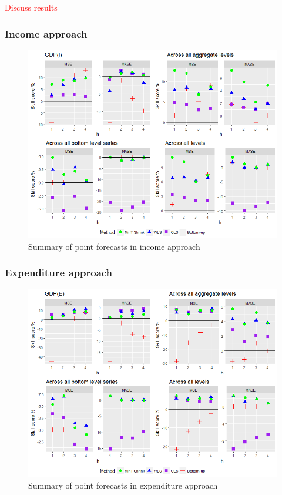 \documentclass[graybox]{svmult}
\begin{document}
\textcolor{red}{Discuss results}

\subsubsection*{Income approach}

\begin{figure}[H]
	\centering
	\small
	\includegraphics[scale=0.50]{Figs/Results/INC-PointF.PNG}
	\caption{Summary of point forecasts in income approach}\label{Exp-PointF}
\end{figure}


\subsubsection*{Expenditure approach}

\begin{figure}[H]
	\centering
	\small
	\includegraphics[scale=0.50]{Figs/Results/EXP-PointF.PNG}
	\caption{Summary of point forecasts in expenditure approach}\label{Inc-PointF}
\end{figure}
\end{document}
